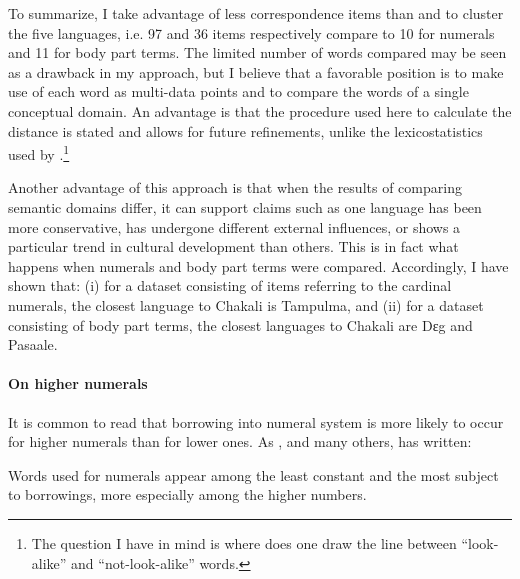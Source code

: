 To summarize, I take advantage of less correspondence items than
\citeauthor{Bend65} and \citeauthor{Mane69b} to cluster the five languages, i.e.
97 and 36 items respectively compare to 10 for numerals and 11 for body part
terms. The limited number of words compared
may be seen as a drawback in my approach, but I believe that a favorable
position is to make use of each word as multi-data points and to compare the
words of a single conceptual domain.  An  advantage is that
 the procedure used here to calculate the distance is stated and allows for
future refinements, unlike the lexicostatistics used by
\citeauthor{Bend65}.\footnote{The question I have in mind is where does  one
draw the line between ``look-alike''  and  ``not-look-alike'' words.} 


Another advantage of this
approach is that when the  results of comparing  semantic domains
differ, it can support claims such as  one language has been more
conservative,  has undergone different external influences, or
shows a particular trend in
cultural development than others. This is in fact what happens when numerals and
body part terms were compared. Accordingly, I have shown that: (i) for a
dataset consisting of
items referring to the cardinal numerals, the closest language to Chakali is
Tampulma, and (ii) for a dataset consisting of body part terms,
the closest languages to Chakali are Dɛg and Pasaale. 


\paragraph{On higher numerals}
\label{sec:NUM-high-num}


It is common to read that borrowing into numeral system is more likely to occur
for higher numerals than for lower ones. As \citeauthor{Ratt32a}, and many
others, has written: 

\begin{Quote}
Words used for numerals appear among the least constant and the most subject to
borrowings, more especially among the higher numbers.
\end{Quote} 
 
